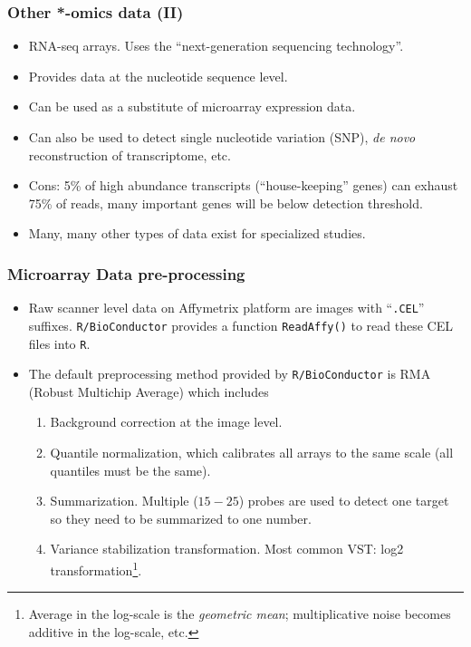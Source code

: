 \begin{frame}
  \frametitle{Other *-omics data (II)}
  \begin{itemize}
  \item RNA-seq arrays. Uses the ``next-generation sequencing
    technology''.
  \item Provides data at the nucleotide sequence level.
  \item Can be used as a substitute of microarray expression data.
  \item Can also be used to detect single nucleotide variation (SNP),
    \textit{de novo} reconstruction of transcriptome, etc.
  \item \alert{Cons:} 5\% of high abundance transcripts
    (``house-keeping'' genes) can exhaust 75\% of reads, many
    important genes will be below detection threshold.
  \item Many, many other types of data exist for specialized studies.
  \end{itemize}
\end{frame}

\begin{frame}
  \frametitle{Microarray Data pre-processing}
  \begin{itemize}
  \item Raw scanner level data on Affymetrix platform are images with
    ``\texttt{.CEL}'' suffixes.  \texttt{R/BioConductor} provides a
    function \texttt{ReadAffy()} to read these CEL files into
    \texttt{R}.
  \item The default preprocessing method provided by
    \texttt{R/BioConductor} is RMA (Robust Multichip Average) which includes
    \begin{enumerate}
    \item Background correction at the image level.
    \item Quantile normalization, which calibrates all arrays to the
      same scale (all quantiles must be the same).
    \item Summarization. Multiple ($15-25$) probes are used to detect
      one target so they need to be summarized to one number.
    \item Variance stabilization transformation.  Most common VST:
      log2 transformation\footnote{Average in the log-scale is
        the \emph{geometric mean}; multiplicative noise becomes
        additive in the log-scale, etc.}.
    \end{enumerate}
  \end{itemize}
  
\end{frame}

